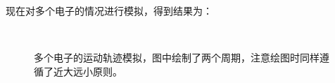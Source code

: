 \documentclass{WHUReport}
\begin{document}
\begin{multicols}{2}
	现在对多个电子的情况进行模拟，得到结果为：
	\begin{figure}[H]
		\centering
		\\
		\caption{多个电子的运动轨迹模拟，图中绘制了两个周期，注意绘图时同样遵循了近大远小原则。}
	\end{figure}

\end{multicols}
\end{document}
